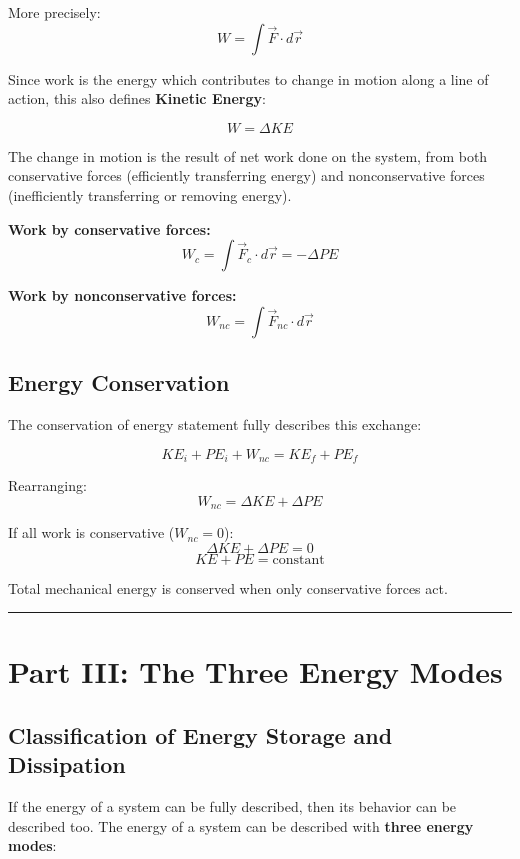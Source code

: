 \documentclass[
  letterpaper,
  DIV=11,
  numbers=noendperiod]{scrartcl}
\begin{document}
More precisely: \[W = \int \vec{F} \cdot d\vec{r}\]

Since work is the energy which contributes to change in motion along a
line of action, this also defines \textbf{Kinetic Energy}:

\[W = \Delta KE\]

The change in motion is the result of net work done on the system, from
both conservative forces (efficiently transferring energy) and
nonconservative forces (inefficiently transferring or removing energy).

\textbf{Work by conservative forces:}
\[W_c = \int \vec{F}_c \cdot d\vec{r} = -\Delta PE\]

\textbf{Work by nonconservative forces:}
\[W_{nc} = \int \vec{F}_{nc} \cdot d\vec{r}\]

\subsection{Energy Conservation}\label{energy-conservation}

The conservation of energy statement fully describes this exchange:

\[KE_i + PE_i + W_{nc} = KE_f + PE_f\]

Rearranging: \[W_{nc} = \Delta KE + \Delta PE\]

If all work is conservative (\(W_{nc} = 0\)):
\[\Delta KE + \Delta PE = 0\] \[KE + PE = \text{constant}\]

Total mechanical energy is conserved when only conservative forces act.

\begin{center}\rule{0.5\linewidth}{0.5pt}\end{center}

\section{Part III: The Three Energy
Modes}\label{part-iii-the-three-energy-modes}

\subsection{Classification of Energy Storage and
Dissipation}\label{classification-of-energy-storage-and-dissipation}

If the energy of a system can be fully described, then its behavior can
be described too. The energy of a system can be described with
\textbf{three energy modes}:
\end{document}
